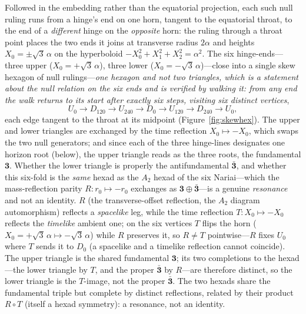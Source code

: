 \documentclass[11pt,a4paper]{article}
\theoremstyle{definition}
\begin{document}
Followed in the embedding rather than the equatorial projection, each such null ruling runs from a hinge's end on one horn, tangent to the equatorial throat, to the end of a \emph{different} hinge on the \emph{opposite} horn: the ruling through a throat point places the two ends it joins at transverse radius $2\alpha$ and heights $X_{0}=\pm\sqrt3\,\alpha$ on the hyperboloid $-X_{0}^{2}+X_{1}^{2}+X_{2}^{2}=\alpha^{2}$. The six hinge-ends---three upper ($X_{0}=+\sqrt3\,\alpha$), three lower ($X_{0}=-\sqrt3\,\alpha$)---close into a single skew hexagon of null rulings---\emph{one hexagon and not two triangles, which is a statement about the null relation on the six ends and is verified by walking it: from any end the walk returns to its start after exactly six steps, visiting six distinct vertices},
\[
  U_{0}\to D_{120}\to U_{240}\to D_{0}\to U_{120}\to D_{240}\to U_{0},
\]
each edge tangent to the throat at its midpoint (Figure~\ref{fig:skewhex}). The upper and lower triangles are exchanged by the time reflection $X_{0}\mapsto-X_{0}$, which swaps the two null generators; and since each of the three hinge-lines designates one horizon root (below), the upper triangle reads as the three roots, the fundamental $\mathbf 3$. Whether the lower triangle is properly the antifundamental $\bar{\mathbf 3}$, and whether this six-fold is the \emph{same} hexad as the $A_{2}$ hexad of the six Nariai---which the mass-reflection parity $R:r_{0}\mapsto-r_{0}$ exchanges as $\mathbf 3\oplus\bar{\mathbf 3}$---is a genuine \emph{resonance} and not an identity. $R$ (the transverse-offset reflection, the $A_{2}$ diagram automorphism) reflects a \emph{spacelike} leg, while the time reflection $T:X_{0}\mapsto-X_{0}$ reflects the \emph{timelike} ambient one; on the six vertices $T$ flips the horn ($X_{0}=+\sqrt3\,\alpha\mapsto-\sqrt3\,\alpha$) while $R$ preserves it, so $R\neq T$ pointwise---$R$ fixes $U_{0}$ where $T$ sends it to $D_{0}$ (a spacelike and a timelike reflection cannot coincide). The upper triangle is the shared fundamental $\mathbf 3$; its two completions to the hexad---the lower triangle by $T$, and the proper $\bar{\mathbf 3}$ by $R$---are therefore distinct, so the lower triangle is the $T$-image, not the proper $\bar{\mathbf 3}$. The two hexads share the fundamental triple but complete by distinct reflections, related by their product $R\circ T$ (itself a hexad symmetry): a resonance, not an identity.
\end{document}
